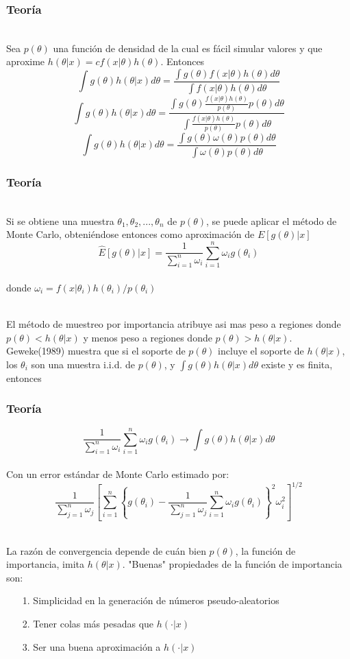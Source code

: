 \documentclass[12pt]{beamer}
\begin{document}
\begin{frame}
\frametitle{Teoría}
~\\Sea $p(\theta)$ una función de densidad de la cual es fácil simular valores y que aproxime $h(\theta|x)=cf(x|\theta)h(\theta)$. Entonces
$$\int g(\theta)h(\theta|x)d\theta=\frac{\int g(\theta)f(x|\theta)h(\theta)d\theta}{\int f(x|\theta)h(\theta)d\theta}$$
$$\int g(\theta)h(\theta|x)d\theta=\frac{\int g(\theta)\frac{f(x|\theta)h(\theta)}{p(\theta)}p(\theta)d\theta}{\int\frac{f(x|\theta)h(\theta)}{p(\theta)}p(\theta)d\theta}$$
$$\int g(\theta)h(\theta|x)d\theta=\frac{\int g(\theta)\omega(\theta)p(\theta)d\theta}{\int \omega(\theta)p(\theta)d\theta}$$
\end{frame}

\begin{frame}
\frametitle{Teoría}
~\\ Si se obtiene una muestra $\theta_{1},\theta_{2},...,\theta_{n}$ de $p(\theta)$, se puede aplicar el método de Monte Carlo, obteniéndose entonces como aproximación de $E[g(\theta)|x]$
$$\hat{E}[g(\theta)|x]=\frac{1}{\sum\limits_{i=1}^{n}\omega_{i}}\sum\limits_{i=1}^{n}\omega_{i}g(\theta_{i})$$
~\\donde $\omega_{i}=f(x|\theta_{i})h(\theta_{i})/p(\theta_{i})$

~\\El método de muestreo por importancia atribuye asi mas peso a regiones donde $p(\theta)<h(\theta|x)$ y menos peso a regiones donde $p(\theta)>h(\theta|x)$. Geweke(1989) muestra que si el soporte de $p(\theta)$ incluye el soporte de $h(\theta|x)$, los $\theta_{i}$ son una muestra i.i.d. de $p(\theta)$, y $\int g(\theta)h(\theta|x)d\theta$ existe y es finita, entonces
\end{frame}

\begin{frame}
\frametitle{Teoría}
$$\frac{1}{\sum\limits_{i=1}^{n}\omega_{i}}\sum\limits_{i=1}^{n}\omega_{i}g(\theta_{i}) \rightarrow \int g(\theta)h(\theta|x)d\theta$$
~\\Con un error estándar de Monte Carlo estimado por:
$$\frac{1}{\sum\limits_{j=1}^{n}\omega_{j}}\left[\sum\limits_{i=1}^{n}\left\lbrace g(\theta_{i})-\frac{1}{\sum\limits_{j=1}^{n}\omega_{j}}\sum\limits_{i=1}^{n}\omega_{i}g(\theta_{i})\right\rbrace^{2}\omega_{i}^2\right]^{1/2} $$
\end{frame}

\begin{frame}
~\\La razón de convergencia depende de cuán bien $p(\theta)$, la función de importancia, imita $h(\theta|x)$. "Buenas" propiedades de la función de importancia son: 
\begin{itemize}
\item[1.]Simplicidad en la generación de números pseudo-aleatorios
\item[2.]Tener colas más pesadas que $h(\cdot|x)$
\item[3.]Ser una buena aproximación a $h(\cdot|x)$
\end{itemize}
\end{frame}
\end{document}
